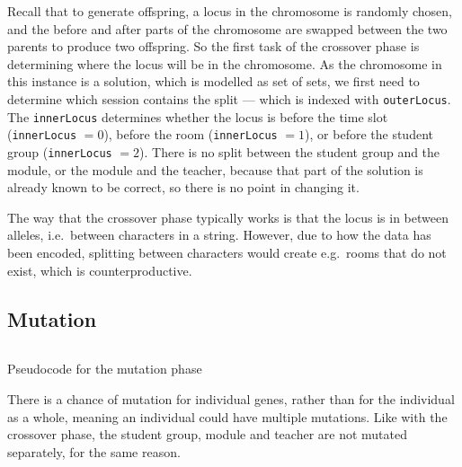 Recall that to generate offspring, a locus in the chromosome is randomly chosen,
and the before and after parts of the chromosome are swapped between the two 
parents to produce two offspring.
So the first task of the crossover phase is determining where the locus will be 
in the chromosome.
As the chromosome in this instance is a solution, which is modelled as set of 
sets, we first need to determine which session contains the split --- which is 
indexed with \verb|outerLocus|.
The \verb|innerLocus| determines whether the locus is before the time slot
(\verb|innerLocus| \( = 0\)), before the room (\verb|innerLocus| \( = 1 \)), or
before the student group (\verb|innerLocus| \(=2\)). There is no split between
the student group and the module, or the module and the teacher, because that 
part of the solution is already known to be correct, so there is no point in
changing it.

The way that the crossover phase typically works is that the locus is in between
alleles, i.e.\ between characters in a string. 
However, due to how the data has been encoded, splitting between characters 
would create e.g.\ rooms that do not exist, which is counterproductive. 

\subsection{Mutation}

\begin{listing}[!ht]
	\inputminted[linenos, fontsize=\footnotesize]{text}{code/mutation.txt}
	\caption{Pseudocode for the mutation phase}
	\label{listing:mutation}
\end{listing}

There is a chance of mutation for individual genes, rather than for the 
individual as a whole, meaning an individual could have multiple mutations.
Like with the crossover phase, the student group, module and teacher are not 
mutated separately, for the same reason.